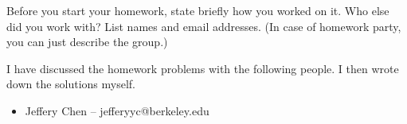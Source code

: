 \documentclass[11pt]{article}
\begin{document}

Before you start your homework, state briefly how you worked on it. Who else did you work with? 
List names and email addresses. (In case of homework party, you can just describe the group.)

\begin{Answer}
	I have discussed the homework problems with the following people. I then wrote down the solutions
	myself.

	\begin{itemize}
		\item Jeffery Chen -- jefferyyc@berkeley.edu
	\end{itemize}
\end{Answer}

\newpage
{}
\end{document}
